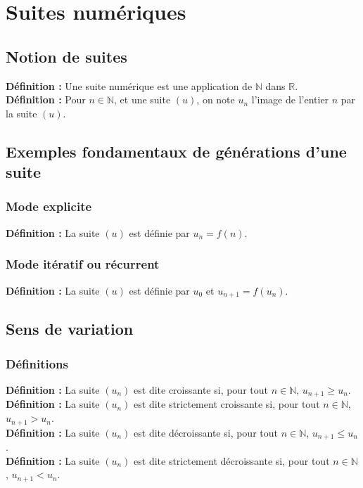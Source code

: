 \documentclass[a4paper,titlepage]{article}
\let\oldsection\section
\renewcommand\section{\clearpage\oldsection}
\begin{document}
\section{Suites numériques}
    \subsection{Notion de suites}
        \textbf{Définition :} Une suite numérique est une application de $\mathbb{N}$ dans $\mathbb{R}$.
        \\
        \textbf{Définition :} Pour $n\in\mathbb{N}$, et une suite $\left(u\right)$, on note $u_{n}$ l’image de l’entier $n$ par la suite $\left(u\right)$.
    \subsection{Exemples fondamentaux de générations d’une suite}
        \subsubsection{Mode explicite}
            \textbf{Définition :} La suite $\left(u\right)$ est définie par $u_{n}=f\left(n\right)$.
        \subsubsection{Mode itératif ou récurrent}
            \textbf{Définition :} La suite $\left(u\right)$ est définie par $u_{0}$ et $u_{n+1}=f\left(u_{n}\right)$.
    \subsection{Sens de variation}
        \subsubsection{Définitions}
            \textbf{Définition :} La suite $\left(u_{n}\right)$ est dite croissante si, pour tout $n\in\mathbb{N}$, $u_{n+1}\geq u_{n}$.
            \\
            \textbf{Définition :} La suite $\left(u_{n}\right)$ est dite strictement croissante si, pour tout $n\in\mathbb{N}$, $u_{n+1}>u_{n}$.
            \\
            \textbf{Définition :} La suite $\left(u_{n}\right)$ est dite décroissante si, pour tout $n\in\mathbb{N}$, $u_{n+1}\leq u_{n}$.
            \\
            \textbf{Définition :} La suite $\left(u_{n}\right)$ est dite strictement décroissante si, pour tout $n\in\mathbb{N}$, $u_{n+1}<u_{n}$.
\end{document}
